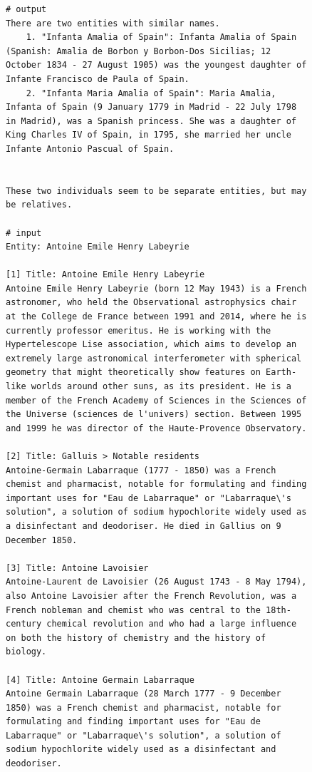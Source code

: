 \begin{figure}[htb]
\begin{lstlisting}
# output
There are two entities with similar names.
    1. "Infanta Amalia of Spain": Infanta Amalia of Spain (Spanish: Amalia de Borbon y Borbon-Dos Sicilias; 12 October 1834 - 27 August 1905) was the youngest daughter of Infante Francisco de Paula of Spain.
    2. "Infanta Maria Amalia of Spain": Maria Amalia, Infanta of Spain (9 January 1779 in Madrid - 22 July 1798 in Madrid), was a Spanish princess. She was a daughter of King Charles IV of Spain, in 1795, she married her uncle Infante Antonio Pascual of Spain.


These two individuals seem to be separate entities, but may be relatives.

# input
Entity: Antoine Emile Henry Labeyrie

[1] Title: Antoine Emile Henry Labeyrie
Antoine Emile Henry Labeyrie (born 12 May 1943) is a French astronomer, who held the Observational astrophysics chair at the College de France between 1991 and 2014, where he is currently professor emeritus. He is working with the Hypertelescope Lise association, which aims to develop an extremely large astronomical interferometer with spherical geometry that might theoretically show features on Earth-like worlds around other suns, as its president. He is a member of the French Academy of Sciences in the Sciences of the Universe (sciences de l'univers) section. Between 1995 and 1999 he was director of the Haute-Provence Observatory.

[2] Title: Galluis > Notable residents
Antoine-Germain Labarraque (1777 - 1850) was a French chemist and pharmacist, notable for formulating and finding important uses for "Eau de Labarraque" or "Labarraque\'s solution", a solution of sodium hypochlorite widely used as a disinfectant and deodoriser. He died in Gallius on 9 December 1850.

[3] Title: Antoine Lavoisier
Antoine-Laurent de Lavoisier (26 August 1743 - 8 May 1794), also Antoine Lavoisier after the French Revolution, was a French nobleman and chemist who was central to the 18th-century chemical revolution and who had a large influence on both the history of chemistry and the history of biology.

[4] Title: Antoine Germain Labarraque
Antoine Germain Labarraque (28 March 1777 - 9 December 1850) was a French chemist and pharmacist, notable for formulating and finding important uses for "Eau de Labarraque" or "Labarraque\'s solution", a solution of sodium hypochlorite widely used as a disinfectant and deodoriser.


\end{lstlisting}
\end{figure}
